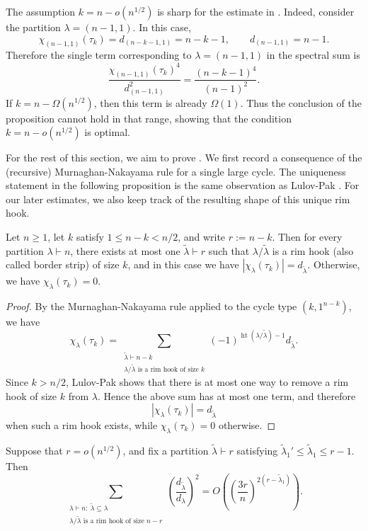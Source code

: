 \begin{rmk}
The assumption $k=n-o(n^{1/2})$ is sharp for the estimate in . Indeed, consider the partition $\lambda=(n-1,1)$. In this case,
$$
\chi_{(n-1,1)}(\tau_k)=d_{(n-k-1,1)}=n-k-1,
\qquad d_{(n-1,1)}=n-1.
$$
Therefore the single term corresponding to $\lambda=(n-1,1)$ in the spectral sum is
$$
\frac{\chi_{(n-1,1)}(\tau_k)^4}{d_{(n-1,1)}^2}=\frac{(n-k-1)^4}{(n-1)^2}.
$$
If $k=n-\Omega(n^{1/2})$, then this term is
already $\Omega(1)$. Thus the conclusion of the proposition cannot hold in that range, showing that the condition $k=n-o(n^{1/2})$ is optimal.
\end{rmk}

For the rest of this section, we aim to prove . We first record a consequence of the (recursive) Murnaghan-Nakayama rule for a single
large cycle. The uniqueness statement in the following proposition is the same observation as Lulov-Pak \cite[Lemma 5.1]{lulov2002rapidly}. For our later estimates, we also keep track of the resulting shape of this unique rim hook.

\begin{lemma}\label{lem: MN one term three types}
Let $n\ge 1$, let $k$ satisfy $1\le n-k<n/2$, and write $r:=n-k$.
Then for every partition $\lambda\vdash n$, 
there exists at most one $\tilde\lambda\vdash r$ such that $\lambda/\widetilde\lambda$ is a rim hook (also called border strip) of size $k$, and in this case we have 
$|\chi_\lambda(\tau_k)|=d_{\widetilde\lambda}$. Otherwise, we have $\chi_\lambda(\tau_k)=0$.
\end{lemma}

\begin{proof}
By the Murnaghan-Nakayama rule applied to the cycle type $(k,1^{n-k})$, we have
$$
\chi_\lambda(\tau_k)=\sum_{\substack{\widetilde\lambda\vdash n-k\\
\lambda/\widetilde\lambda\text{ is a rim hook of size }k}}
(-1)^{\operatorname{ht}(\lambda/\widetilde\lambda)-1}
d_{\widetilde\lambda}.
$$
Since $k>n/2$, Lulov-Pak \cite[Lemma 5.1]{lulov2002rapidly} shows that there is at most one way to remove a rim hook of size $k$ from $\lambda$. Hence the above sum has at most one term, and therefore 
$$|\chi_\lambda(\tau_k)|=d_{\widetilde\lambda}$$
when such a rim hook exists, while $\chi_\lambda(\tau_k)=0$ otherwise.
\end{proof}

\begin{prop}
\label{prop: fixed core rim hook sum}
Suppose that $r=o(n^{1/2})$, and fix a partition
$\widetilde\lambda\vdash r$ satisfying
$\widetilde\lambda_1'\le \widetilde\lambda_1\le r-1$. Then
$$
\sum_{\substack{\lambda\vdash n:\ \widetilde\lambda\subseteq\lambda\\
\lambda/\widetilde\lambda\text{ is a rim hook of size }n-r}}
\left(\frac{d_{\widetilde\lambda}}{d_\lambda}\right)^2
=
O\left(
\left(\frac{3r}{n}\right)^{2(r-\widetilde\lambda_1)}
\right).
$$
\end{prop}

